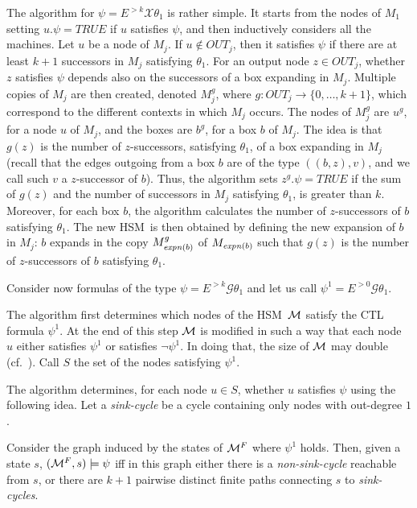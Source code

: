 \documentclass[letterpaper,twocolumn,10pt]{article}
\def    \ctl        {\mbox{\textsc{CTL }\xspace}}
\def    \G          {\mathcal{G}}
\def    \M          {{\cal M}}
\def    \X          {\mathcal{X}}
\newcommand{\HSM}{HSM}
\begin{document}
The algorithm for   $\psi=E^{> k} \X \theta_1 $ is rather simple.
It starts from the nodes of $M_1$ setting
$u.\psi=TRUE$ if $u$ satisfies $\psi$, and  then inductively considers  all the machines.
Let $u$ be a node  of $M_j$.
If  $u \notin OUT_j$, then it
satisfies $\psi$ if there are at least $k+1$ successors in $M_j$ satisfying $\theta_1$.
For an output  node $z \in OUT_j$, whether $z$ satisfies  $\psi$ depends also on the successors of a box expanding in $M_j$.
Multiple copies of $M_j$ are then created, denoted $M_j^g$, where  $g:OUT_j \rightarrow \{0,\ldots,k+1\}$,
which correspond  to the different contexts in which $M_j$ occurs.
The  nodes  of $M_j^g$  are   $u^g$, for a node  $u$ of $M_j$,  and the boxes are $b^g$, for a box $b$
of $M_j$.
The idea is that $ g(z)$ is the number of  $z$-successors,
satisfying $\theta_1$,  of a box expanding in $M_j$
(recall that the edges outgoing from a box $b$ are of the type $((b,z),v)$, and we call such $v$
a $z$-successor of $b$).
Thus,  the algorithm sets $z^g.\psi=TRUE$ if the sum of $g(z)$ and the number of successors in $M_j$ satisfying $\theta_1$,
is greater than $k$.
Moreover, for each box $b$, the algorithm calculates   the number of  $z$-successors of $b$ satisfying  $\theta_1$.
 The new \HSM\ is then obtained by defining the new expansion of  $b$ in $M_j$:
$b$ expands in the copy  $M_{\mathit{expn}(b)}^g$ of $M_{\mathit{expn}(b)}$ such that
$g(z)$ is  the number of  $z$-successors of $b$ satisfying  $\theta_1$.



Consider  now formulas of the type $\psi=E^{> k} \G \theta_1 $ and let us call $\psi^1=E^{> 0}  \G \theta_1 $.

The algorithm  first determines which nodes of the \HSM\ $\M$ satisfy the \ctl
formula $\psi^1$.  At the end of this step
 $\M$ is modified in such a way that  each node $u$ either  satisfies $\psi^1$ or
satisfies $\neg  \psi^1$. In doing that, the size of $\M$ may double (cf.~\cite{AY01}).
Call $S$ the set of the nodes satisfying $\psi^1$.

The algorithm determines, for  each node $u\in S$, whether $u$ satisfies $\psi$
using the following idea. Let a {\em sink-cycle} be a cycle
containing only nodes with out-degree $1$.

Consider
 the graph induced by the states of $\M^F$ where $\psi^1$  holds.
Then, given a state $s $, $(\M^F, s)
\models \psi$   iff in this graph
either there is a \emph{non-sink-cycle} reachable from $s$, or
there are $k+1$ pairwise distinct finite paths connecting $s$ to
\emph{sink-cycles}.
\end{document}
